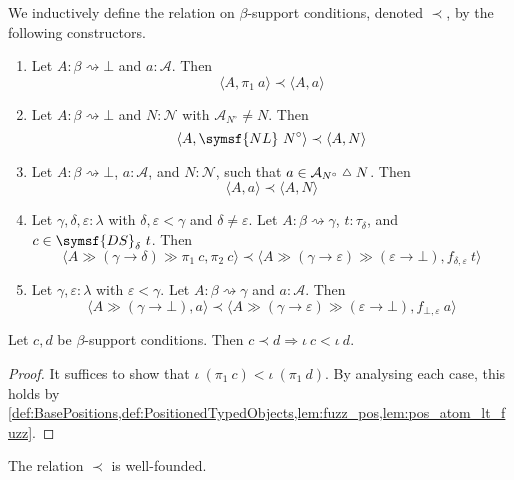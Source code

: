 \begin{definition}
    \label{def:Constrains}
    We inductively define the  relation on \( \beta \)-support conditions, denoted \( \prec \), by the following constructors.
    \begin{enumerate}
        \item Let \( A : \beta \rightsquigarrow \bot \) and \( a : \mathcal A \).
        Then
        \[ \langle A, \pi_1\ a \rangle \prec \langle A, a \rangle \]
        \item Let \( A : \beta \rightsquigarrow \bot \) and \( N : \mathcal N \) with \( \mathcal A_{N^\circ} \neq N \).
        Then
        \[ \langle A, \symsf{NL}\ N^\circ \rangle \prec \langle A, N \rangle \]
        \item Let \( A : \beta \rightsquigarrow \bot \), \( a : \mathcal A \), and \( N : \mathcal N \), such that \( a \in \mathcal A_{N^\circ} \symmdiff N \).
        Then
        \[ \langle A, a \rangle \prec \langle A, N \rangle \]
        \item Let \( \gamma, \delta, \varepsilon : \lambda \) with \( \delta, \varepsilon < \gamma \) and \( \delta \neq \varepsilon \).
        Let \( A : \beta \rightsquigarrow \gamma \), \( t : \tau_\delta \), and \( c \in \symsf{DS}_\delta\ t \).
        Then
        \[ \langle A \gg (\gamma \to \delta) \gg \pi_1\ c, \pi_2\ c \rangle \prec \langle A \gg (\gamma \to \varepsilon) \gg (\varepsilon \to \bot), f_{\delta, \varepsilon}\ t \rangle \]
        \item Let \( \gamma, \varepsilon : \lambda \) with \( \varepsilon < \gamma \).
        Let \( A : \beta \rightsquigarrow \gamma \) and \( a : \mathcal A \).
        Then
        \[ \langle A \gg (\gamma \to \bot), a \rangle \prec \langle A \gg (\gamma \to \varepsilon) \gg (\varepsilon \to \bot), f_{\bot, \varepsilon}\ a \rangle \]
    \end{enumerate}
\end{definition}
\begin{lemma}
    Let \( c, d \) be \( \beta \)-support conditions.
    Then \( c \prec d \Rightarrow \iota\ c < \iota\ d \).
\end{lemma}
\begin{proof}
    It suffices to show that \( \iota\ (\pi_1\ c) < \iota\ (\pi_1\ d) \).
    By analysing each case, this holds by \cref{def:BasePositions,def:PositionedTypedObjects,lem:fuzz_pos,lem:pos_atom_lt_fuzz}.
\end{proof}
\begin{lemma}
    The relation \( \prec \) is well-founded.
\end{lemma}
